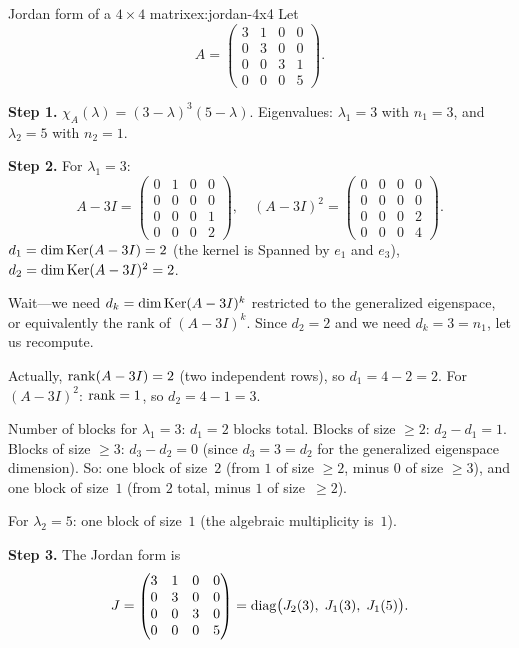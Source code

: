 \begin{example}{Jordan form of a $4 \times 4$ matrix}{ex:jordan-4x4}
Let
\[
  A = \begin{pmatrix}
    3 & 1 & 0 & 0 \\
    0 & 3 & 0 & 0 \\
    0 & 0 & 3 & 1 \\
    0 & 0 & 0 & 5
  \end{pmatrix}.
\]

\textbf{Step 1.}  $\chi_A(\lambda) = (3 - \lambda)^3(5 - \lambda)$.
Eigenvalues: $\lambda_1 = 3$ with $n_1 = 3$, and $\lambda_2 = 5$
with $n_2 = 1$.

\textbf{Step 2.}  For $\lambda_1 = 3$:
\[
  A - 3I = \begin{pmatrix}
    0 & 1 & 0 & 0 \\
    0 & 0 & 0 & 0 \\
    0 & 0 & 0 & 1 \\
    0 & 0 & 0 & 2
  \end{pmatrix}, \quad
  (A - 3I)^2 = \begin{pmatrix}
    0 & 0 & 0 & 0 \\
    0 & 0 & 0 & 0 \\
    0 & 0 & 0 & 2 \\
    0 & 0 & 0 & 4
  \end{pmatrix}.
\]
$d_1 = \dim\operatorname{Ker}(A - 3I) = 2$ (the kernel is Spanned by
$e_1$ and $e_3$), $d_2 = \dim\operatorname{Ker}(A-3I)^2 = 2$.

Wait---we need $d_k = \dim\operatorname{Ker}(A-3I)^k$ restricted to the generalized
eigenspace, or equivalently the rank of $(A - 3I)^k$.
Since $d_2 = 2$ and we need $d_k = 3 = n_1$, let us recompute.

Actually, $\operatorname{rank}(A - 3I) = 2$ (two independent rows), so
$d_1 = 4 - 2 = 2$.  For $(A - 3I)^2$: $\operatorname{rank} = 1$, so
$d_2 = 4 - 1 = 3$.

Number of blocks for $\lambda_1 = 3$: $d_1 = 2$ blocks total.
Blocks of size $\geq 2$: $d_2 - d_1 = 1$.
Blocks of size $\geq 3$: $d_3 - d_2 = 0$ (since $d_3 = 3 = d_2$
for the generalized eigenspace dimension).
So: one block of size~$2$ (from $1$ of size $\geq 2$, minus $0$ of
size $\geq 3$), and one block of size~$1$ (from $2$ total, minus $1$
of size~$\geq 2$).

For $\lambda_2 = 5$: one block of size~$1$ (the algebraic multiplicity
is~$1$).

\textbf{Step 3.}  The Jordan form is
\[
  J = \begin{pmatrix}
    3 & 1 & 0 & 0 \\
    0 & 3 & 0 & 0 \\
    0 & 0 & 3 & 0 \\
    0 & 0 & 0 & 5
  \end{pmatrix}
  = \operatorname{diag}\bigl(J_2(3),\; J_1(3),\; J_1(5)\bigr).
\]


\end{example}
